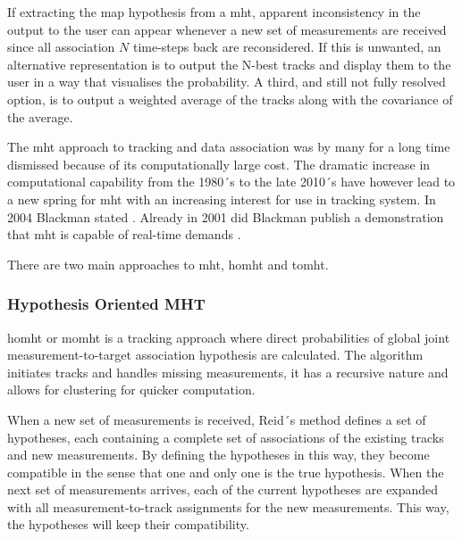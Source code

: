 If extracting the \gls{map} hypothesis from a \gls{mht}, apparent inconsistency in the output to the user can appear whenever a new set of \glspl{measurement} are received since all association $N$ time-steps back are reconsidered. If this is unwanted, an alternative representation is to output the N-best tracks and display them to the user in a way that visualises the probability. A third, and still not fully resolved option, is to output a weighted average of the tracks along with the covariance of the average.

The \gls{mht} approach to tracking and data association was by many for a long time dismissed because of its computationally large cost. The dramatic increase in computational capability from the 1980´s to the late 2010´s have however lead to a new spring for \gls{mht} with an increasing interest for use in tracking system. In 2004 Blackman stated \cite{Blackman2004}. Already in 2001 did Blackman publish a demonstration that \gls{mht} is capable of real-time demands \cite{Blackman2001}.

There are two main approaches to \gls{mht}, \gls{homht} and \gls{tomht}.

\subsubsection{Hypothesis Oriented MHT}
\gls{homht} or \gls{momht} is a tracking approach where direct probabilities of global joint measurement-to-target association hypothesis are calculated. The algorithm initiates tracks and handles missing \glspl{measurement}, it has a recursive nature and allows for clustering for quicker computation.

When a new set of \glspl{measurement} is received, Reid´s method defines a set of hypotheses, each containing a complete set of associations of the existing tracks and new \glspl{measurement}. By defining the hypotheses in this way, they become compatible in the sense that one and only one is the true hypothesis. When the next set of \glspl{measurement} arrives, each of the current hypotheses are expanded with all measurement-to-track assignments for the new \glspl{measurement}. This way, the hypotheses will keep their compatibility.

